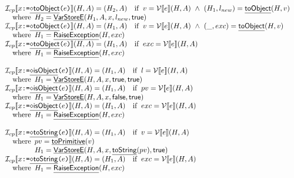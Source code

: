 \[\begin{array}{ll}
\I _{cp}\lbr x \TT{:=} \chfi{toObject}\TT{(}e\TT{)} \rbr(H,A)
 = (H_2,A)\quad\ifc{v = \V\lbr e\rbr(H,A)\ \land\ (H_1, l_{new}) = \chf{toObject}(H, v)}\\
 \quad\wherec{
   H_2=\chf{VarStoreE}(H_1,A,x,l_{new},\SF{true})
}\\
\I _{cp}\lbr x \TT{:=} \chfi{toObject}\TT{(}e\TT{)} \rbr(H,A)
 = (H_1, A)\quad\ifc{v = \V\lbr e\rbr(H,A)\ \land\ (\_, exc) = \chf{toObject}(H, v)}\\
 \quad\wherec{
   H_1=\chf{RaiseException}(H,exc)
}\\
\I _{cp}\lbr x \TT{:=} \chfi{toObject}\TT{(}e\TT{)} \rbr(H,A)
 = (H_1, A)\quad\ifc{exc = \V\lbr e\rbr(H,A)}\\
\quad\wherec{
  H_1=\chf{RaiseException}(H, exc)
}
\\\\
\I _{cp}\lbr x \TT{:=} \chfi{isObject}\TT{(}e\TT{)} \rbr(H,A)
 = (H_1,A)\quad\ifc{l = \V\lbr e\rbr(H,A)}\\
\quad\wherec{
  H_1=\chf{VarStoreE}(H,A,x,\vtrue,\SF{true})
}\\
\I _{cp}\lbr x \TT{:=} \chfi{isObject}\TT{(}e\TT{)} \rbr(H,A)
 = (H_1,A)\quad\ifc{pv = \V\lbr e\rbr(H,A)}\\
\quad\wherec{
  H_1 = \chf{VarStoreE}(H,A,x,\vfalse,\SF{true})
}\\
\I _{cp}\lbr x \TT{:=} \chfi{isObject}\TT{(}e\TT{)} \rbr(H,A)
 = (H_1, A)\quad\ifc{exc = \V\lbr e\rbr(H,A)}\\
\quad\wherec{
  H_1=\chf{RaiseException}(H,exc)
}
\\\\
\I _{cp}\lbr x \TT{:=} \chfi{toString}\TT{(}e\TT{)} \rbr(H,A)
= (H_1, A)\quad\ifc{v = \V\lbr e\rbr(H,A)}
\\\quad\wherec{
  pv=\chf{toPrimitive}(v)\\
  H_1=\chf{VarStoreE}(H,A,x,\chf{toString}(pv),\vtrue)\\
}\\
\I _{cp}\lbr x \TT{:=} \chfi{toString}\TT{(}e\TT{)} \rbr(H,A)
 = (H_1, A)\quad\ifc{exc = \V\lbr e\rbr(H,A)}\\
\quad\wherec{
  H_1=\chf{RaiseException}(H,exc)
}
\\\\
\end{array}
\]
